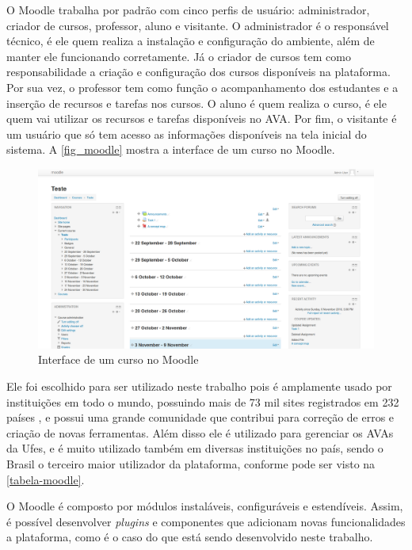 \documentclass[
	12pt,				%
	openright,			%
	oneside,			%
	a4paper,			%
	english,			%
	french,				%
	spanish,			%
	brazil				%
	]{abntex2}
\begin{document}
O Moodle trabalha por padrão com cinco perfis de usuário: administrador, criador de cursos, professor, aluno e visitante. O administrador é o responsável técnico, é ele quem realiza a instalação e configuração do ambiente, além de manter ele funcionando corretamente. Já o criador de cursos tem como responsabilidade a criação e configuração dos cursos disponíveis na plataforma. Por sua vez, o professor tem como função o acompanhamento dos estudantes e a inserção de recursos e tarefas nos cursos. O aluno é quem realiza o curso, é ele quem vai utilizar os recursos e tarefas disponíveis no AVA. Por fim, o visitante é um usuário que só tem acesso as informações disponíveis na tela inicial do sistema. A \autoref{fig_moodle} mostra a interface de um curso no Moodle.


\begin{figure}[htb]
	\caption{\label{fig_moodle}Interface de um curso no Moodle}
	\begin{center}
		\includegraphics[scale=0.2]{moodle.png}
	\end{center}
\end{figure}


Ele foi escolhido para ser utilizado neste trabalho pois é amplamente usado por instituições em todo o mundo, possuindo mais de 73 mil sites registrados em 232 países \cite{MoodleStat2016}, e possui uma grande comunidade que contribui para correção de erros e criação de novas ferramentas. Além disso ele é utilizado para gerenciar os AVAs da Ufes, e é muito utilizado também em diversas instituições no país, sendo o Brasil o terceiro maior utilizador da plataforma, conforme pode ser visto na \autoref{tabela-moodle}.



O Moodle é composto por módulos instaláveis, configuráveis e estendíveis. Assim, é possível desenvolver \textit{plugins} e componentes que adicionam novas funcionalidades a plataforma, como é o caso do que está sendo desenvolvido neste trabalho.
\end{document}
